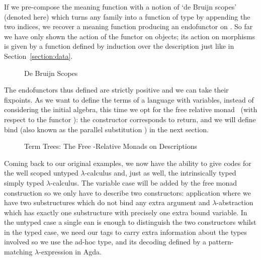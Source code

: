 If we pre-compose the meaning function  with a notion of `de Bruijn scopes'
(denoted  here) which turns any   family into a function
of type      by appending the two
 indices, we recover a meaning function producing an endofunctor on
 . So far we have only shown the action of the functor on objects;
its action on morphisms is given by a function  defined by induction over
the description just like in Section~\ref{section:data}.

\begin{figure}[h]
\caption{De Bruijn Scopes}\label{figure:debruijnscope}
\end{figure}

The endofunctors thus defined are strictly positive and we can take their fixpoints.
As we want to define the terms of a language with variables, instead of
considering the initial algebra, this time we opt for the free relative
monad~\cite{JFR4389} (with respect to the functor ): the 
constructor corresponds to return, and we will define bind (also known as
the parallel substitution ) in the next section.


\begin{figure}[h]
\caption{Term Trees: The Free -Relative Monads on Descriptions}\label{figure:freemonad}
\end{figure}

Coming back to our original examples, we now have the ability to give
codes for the well scoped untyped $\lambda$-calculus and, just as well,
the intrinsically typed simply typed $\lambda$-calculus.
The variable case will be added by the free monad construction so we
only have to describe two constructors: application where we have two
substructures which do not bind any extra argument and $\lambda$-abstraction
which has exactly one substructure with precisely one extra bound variable.
In the untyped case a single ean is enough to distinguish the two constructors
whilst in the typed case, we need our tags to carry extra information about the
types involved so we use the ad-hoc  type,
and its decoding  defined by a pattern-matching \(\lambda\)-expression in Agda.

